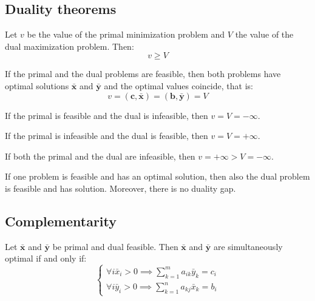 \subsection{Duality theorems}
\begin{theorem}
    Let $v$ be the value of the primal minimization problem and $V$ the value of the dual maximization problem. 
    Then: 
    \[v\geq V\]
\end{theorem}

\begin{theorem}
    If the primal and the dual problems are feasible, then both problems have optimal solutions $\bar{\mathbf{x}}$ and $\bar{\mathbf{y}}$ and the optimal values coincide, that is: 
    \[v=(\mathbf{c},\bar{\mathbf{x}})=(\mathbf{b},\bar{\mathbf{y}})=V\]

    If the primal is feasible and the dual is infeasible, then $v=V=-\infty$. 

    If the primal is infeasible and the dual is feasible, then $v=V=+\infty$. 

    If both the primal and the dual are infeasible, then $v=+\infty>V=-\infty$.
\end{theorem}
\begin{corollary}
    If one problem is feasible and has an optimal solution, then also the dual problem is feasible and has solution. 
    Moreover, there is no duality gap. 
\end{corollary}

\subsection{Complementarity}
\begin{theorem}
    Let $\bar{\mathbf{x}}$ and $\bar{\mathbf{y}}$ be primal and dual feasible. 
    Then $\bar{\mathbf{x}}$ and $\bar{\mathbf{y}}$ are simultaneously optimal if and only if: 
    \[\begin{cases}
        \forall i \bar{x}_i>0 \implies\sum_{k=1}^ma_{ik}\bar{y}_k=c_i \\
        \forall i \bar{y}_i>0 \implies\sum_{k=1}^na_{kj}\bar{x}_k=b_i 
    \end{cases}\]
\end{theorem}